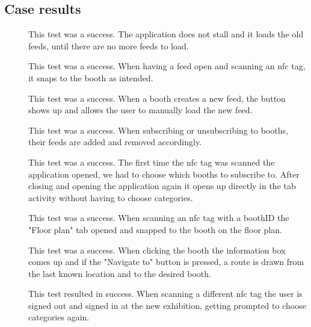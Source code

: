 \subsection*{Case results}
\begin{description}
\item[\casetwo] This test was a success. The application does not stall and it loads the old feeds, until there are no more feeds to load.
\item[\casethree] This test was a success. When having a feed open and scanning an \ac{nfc} tag, it snaps to the booth as intended.
\item[\casefour] This test was a success. When a booth creates a new feed, the button shows up and allows the user to manually load the new feed.
\item[\casefive] This test was a success. When subscribing or unsubscribing to booths, their feeds are added and removed accordingly.
\item[\casesix] This test was a success. The first time the \ac{nfc} tag was scanned the application opened, we had to choose which booths to subscribe to. After closing and opening the application again it opens up directly in the tab activity without having to choose categories.
\item[\caseseven] This test was a success. When scanning an \ac{nfc} tag with a boothID the "Floor plan" tab opened and snapped to the booth on the floor plan.
\item[\caseeight] This test was a success. When clicking the booth the information box comes up and if the "Navigate to" button is pressed, a route is drawn from the last known location and to the desired booth.
\item[\casenine] This test resulted in success. When scanning a different \ac{nfc} tag the user is signed out and signed in at the new exhibition, getting prompted to choose categories again.
\end{description}
